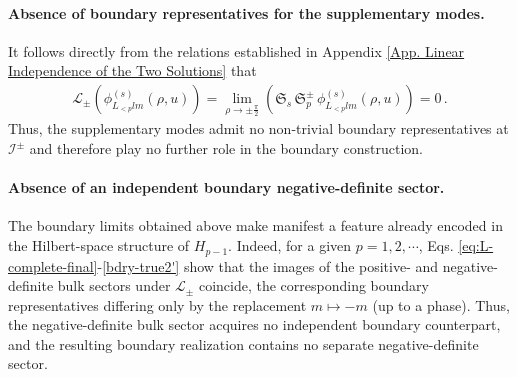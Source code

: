 \documentclass[aps,twocolumn,nofootinbib]{revtex4}
\begin{document}
\paragraph{Absence of boundary representatives for the supplementary modes.} It follows directly from the relations established in Appendix \ref{App. Linear Independence of the Two Solutions} that
\begin{align}
    \mathcal{L}_\pm\left(\phi^{(s)}_{L^{}_{<p}lm}(\rho,u)\right) =\! \lim_{\rho \longrightarrow \pm\frac{\pi}{2}} \left(\mathfrak{S}^{}_s\,\mathfrak{S}^\pm_p \,\phi^{(s)}_{L^{}_{<p}lm}(\rho,u)\right) = 0 \,.
\end{align}
Thus, the supplementary modes admit no non-trivial boundary representatives at ${\mathcal{I}}^\pm$ and therefore play no further role in the boundary construction. 

\paragraph{Absence of an independent boundary negative-definite sector.} The boundary limits obtained above make manifest a feature already encoded in the Hilbert-space structure of $H_{p-1}$. Indeed, for a given $p=1,2,\cdots$, Eqs. \eqref{eq:L-complete-final}-\eqref{bdry-true2'} show that the images of the positive- and negative-definite bulk sectors under ${\mathcal{L}}_\pm$ coincide, the corresponding boundary representatives differing only by the replacement $m\longmapsto -m$ (up to a phase). Thus, the negative-definite bulk sector acquires no independent boundary counterpart, and the resulting boundary realization contains no separate negative-definite sector.
\end{document}
